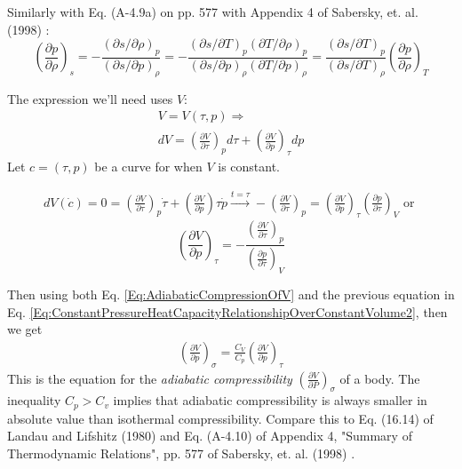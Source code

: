\documentclass[twoside,landscape,10pt]{amsart}
\theoremstyle{plain}
\theoremstyle{definition}
\theoremstyle{remark}
\theoremstyle{remark}
\begin{document}
\begin{multicols*}{2}
Similarly with Eq. (A-4.9a) on pp. 577 with Appendix 4 of  Sabersky, et. al. (1998) \cite{SAHG1998}:
\[
\left( \frac{ \partial p }{ \partial \rho} \right)_s = - \frac{ (\partial s / \partial \rho)_p }{ (\partial s / \partial p)_{\rho}}  = - \frac{ (\partial s / \partial T)_p (\partial T / \partial \rho)_p }{ (\partial s / \partial p)_{\rho} (\partial T / \partial p )_{\rho}} = \frac{ (\partial s / \partial T)_p }{ (\partial s / \partial T)_{\rho}} \left( \frac{ \partial p }{ \partial \rho} \right)_T
\]

The expression we'll need uses $V$:
\[
\begin{gathered}
V = V(\tau, p) \Longrightarrow \\
dV = \left( \frac{\partial V}{\partial \tau} \right)_p d\tau + \left( \frac{\partial V}{\partial p} \right)_{\tau} dp 
\end{gathered}
\]
Let $c=(\tau, p)$  be a curve for when $V$ is constant.

\[
\begin{gathered}
dV(\dot{c}) = 0 = \left( \frac{\partial V}{\partial \tau} \right)_p \dot{\tau} + \left( \frac{\partial V}{ \partial p } \right){\tau} \dot{p} \xrightarrow{ t = \tau} - \left( \frac{\partial V}{ \partial \tau} \right)_p = \left( \frac{\partial V}{\partial p} \right)_{\tau} \left( \frac{\partial p}{\partial \tau} \right)_V \text{ or } 
\end{gathered}
\]
\begin{equation}
\left( \frac{\partial V}{\partial p} \right)_{\tau} = -\frac{\left( \frac{\partial V}{\partial \tau} \right)_p }{ \left( \frac{\partial p}{\partial \tau} \right)_V}
\end{equation}

Then using both Eq. \ref{Eq:AdiabaticCompressionOfV} and the previous equation in Eq. \ref{Eq:ConstantPressureHeatCapacityRelationshipOverConstantVolume2}, then we get 
\begin{equation}
\begin{gathered}
\boxed{ \left( \frac{\partial V}{\partial p }\right)_{\sigma} = \frac{C_V}{C_p} \left( \frac{\partial V}{\partial p } \right)_{\tau} }
\end{gathered}
\end{equation}
This is the equation for the \emph{adiabatic compressibility} $\left( \frac{\partial V}{ \partial P} \right)_{\sigma}$ of a body. The inequality $C_p > C_v$ implies that adiabatic compressibility is always smaller in absolute value than isothermal compressibility. Compare this to Eq. (16.14) of Landau and Lifshitz (1980) and Eq. (A-4.10) of Appendix 4, "Summary of Thermodynamic Relations", pp. 577 of Sabersky, et. al. (1998) \cite{SAHG1998}.


\end{multicols*}
\end{document}
